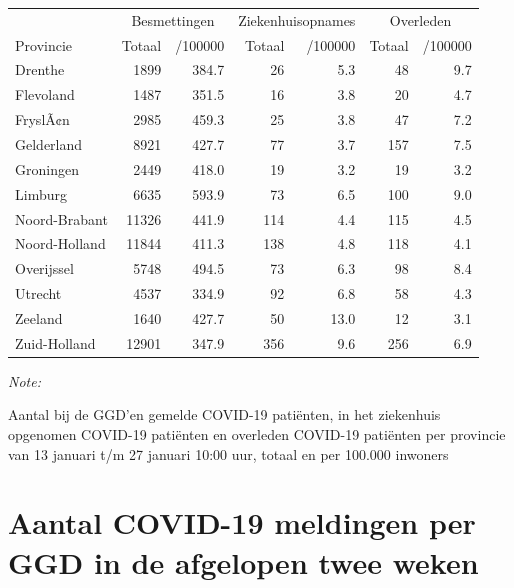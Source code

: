 \documentclass[
  english,
  man,floatsintext]{apa6}
\begin{document}
\begin{table}[H]
\centering
\begin{threeparttable}
\begin{tabular}{lrrrrrr}
\toprule
\multicolumn{1}{c}{ } & \multicolumn{2}{c}{Besmettingen} & \multicolumn{2}{c}{Ziekenhuisopnames} & \multicolumn{2}{c}{Overleden} \\
\cmidrule(l{3pt}r{3pt}){2-3} \cmidrule(l{3pt}r{3pt}){4-5} \cmidrule(l{3pt}r{3pt}){6-7}
Provincie & Totaal & /100000 & Totaal & /100000 & Totaal & /100000\\
\midrule
Drenthe & 1899 & 384.7 & 26 & 5.3 & 48 & 9.7\\
Flevoland & 1487 & 351.5 & 16 & 3.8 & 20 & 4.7\\
FryslÃ¢n & 2985 & 459.3 & 25 & 3.8 & 47 & 7.2\\
Gelderland & 8921 & 427.7 & 77 & 3.7 & 157 & 7.5\\
Groningen & 2449 & 418.0 & 19 & 3.2 & 19 & 3.2\\
Limburg & 6635 & 593.9 & 73 & 6.5 & 100 & 9.0\\
Noord-Brabant & 11326 & 441.9 & 114 & 4.4 & 115 & 4.5\\
Noord-Holland & 11844 & 411.3 & 138 & 4.8 & 118 & 4.1\\
Overijssel & 5748 & 494.5 & 73 & 6.3 & 98 & 8.4\\
Utrecht & 4537 & 334.9 & 92 & 6.8 & 58 & 4.3\\
Zeeland & 1640 & 427.7 & 50 & 13.0 & 12 & 3.1\\
Zuid-Holland & 12901 & 347.9 & 356 & 9.6 & 256 & 6.9\\
\bottomrule
\end{tabular}
\begin{tablenotes}
\item \textit{Note: } 
\item Aantal bij de GGD’en gemelde COVID-19 patiënten, in het ziekenhuis opgenomen COVID-19 patiënten en overleden COVID-19 patiënten per provincie van 13 januari t/m 27 januari 10:00 uur, totaal en per 100.000 inwoners
\end{tablenotes}
\end{threeparttable}
\end{table}

\newpage

\hypertarget{aantal-covid-19-meldingen-per-ggd-in-de-afgelopen-twee-weken}{%
\section{Aantal COVID-19 meldingen per GGD in de afgelopen twee weken}\label{aantal-covid-19-meldingen-per-ggd-in-de-afgelopen-twee-weken}}
\end{document}
